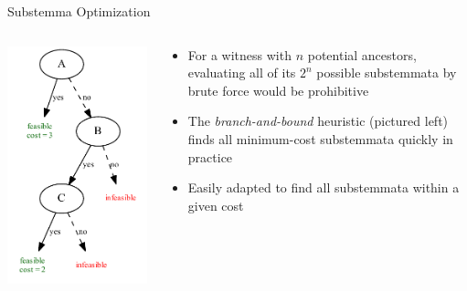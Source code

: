 \documentclass[10pt]{beamer}
\begin{document}
	\begin{frame}{Substemma Optimization}
		\begin{columns}
			\begin{column}{0.4\textwidth}
				\includegraphics[width=\textwidth]{../graphics/branch-and-bound-example.pdf}
			\end{column}
			\begin{column}{0.55\textwidth}
				\begin{itemize}
					\item For a witness with $n$ potential ancestors, evaluating all of its $2^n$ possible substemmata by brute force would be prohibitive
					\item The \emph{branch-and-bound} heuristic (pictured left) finds all minimum-cost substemmata quickly in practice
					\item Easily adapted to find all substemmata within a given cost
				\end{itemize}
			\end{column}
		\end{columns}
	\end{frame}
\end{document}
